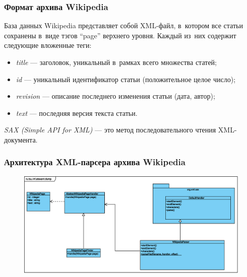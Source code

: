\documentclass{beamer}
\begin{document}
\begin{frame}
\frametitle{Формат архива Wikipedia}

База данных Wikipedia представляет собой XML-файл, в~котором
все статьи сохранены в~виде тэгов ``page'' верхнего уровня. 
Каждый из~них содержит следующие вложенные теги:

\begin{itemize}
\item{{\it title} --- заголовок, уникальный в~рамках всего множества статей;}
\item{{\it id} --- уникальный идентификатор статьи (положительное целое число);}
\item{{\it revision} --- описание последнего изменения статьи (дата, автор);}
\item{{\it text} --- последняя версия текста статьи.}
\end{itemize}

\vspace{0.3cm}
{\it SAX (Simple API for XML)} --- 
это метод последовательного чтения XML-документа.

\end{frame}

\begin{frame}
\frametitle{Архитектура XML-парсера архива Wikipedia}
\begin{figure}
\begin{center}
\includegraphics[scale=0.39]{../eps/ru.tsu.inf.atexant.dump.eps}
\end{center}
\end{figure}
\end{frame}
\end{document}
